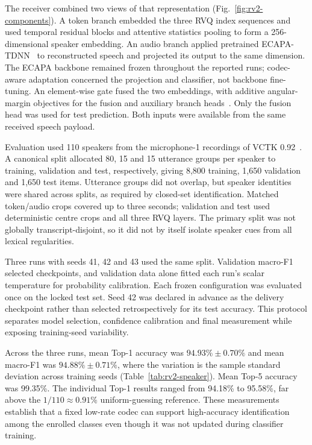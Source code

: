 The receiver combined two views of that representation (Fig.~\ref{fig:rv2-components}). A token branch embedded the three RVQ index sequences and used temporal residual blocks and attentive statistics pooling to form a 256-dimensional speaker embedding. An audio branch applied pretrained ECAPA-TDNN~\cite{ecapa} to reconstructed speech and projected its output to the same dimension. The ECAPA backbone remained frozen throughout the reported runs; codec-aware adaptation concerned the projection and classifier, not backbone fine-tuning. An element-wise gate fused the two embeddings, with additive angular-margin objectives for the fusion and auxiliary branch heads~\cite{arcface}. Only the fusion head was used for test prediction. Both inputs were available from the same received speech payload.

Evaluation used 110 speakers from the microphone-1 recordings of VCTK 0.92~\cite{vctk}. A canonical split allocated 80, 15 and 15 utterance groups per speaker to training, validation and test, respectively, giving 8,800 training, 1,650 validation and 1,650 test items. Utterance groups did not overlap, but speaker identities were shared across splits, as required by closed-set identification. Matched token/audio crops covered up to three seconds; validation and test used deterministic centre crops and all three RVQ layers. The primary split was not globally transcript-disjoint, so it did not by itself isolate speaker cues from all lexical regularities.

Three runs with seeds 41, 42 and 43 used the same split. Validation macro-F1 selected checkpoints, and validation data alone fitted each run's scalar temperature for probability calibration. Each frozen configuration was evaluated once on the locked test set. Seed 42 was declared in advance as the delivery checkpoint rather than selected retrospectively for its test accuracy. This protocol separates model selection, confidence calibration and final measurement while exposing training-seed variability.

Across the three runs, mean Top-1 accuracy was $94.93\%\pm0.70\%$ and mean macro-F1 was $94.88\%\pm0.71\%$, where the variation is the sample standard deviation across training seeds (Table~\ref{tab:rv2-speaker}). Mean Top-5 accuracy was 99.35\%. The individual Top-1 results ranged from 94.18\% to 95.58\%, far above the $1/110\approx0.91\%$ uniform-guessing reference. These measurements establish that a fixed low-rate codec can support high-accuracy identification among the enrolled classes even though it was not updated during classifier training.

